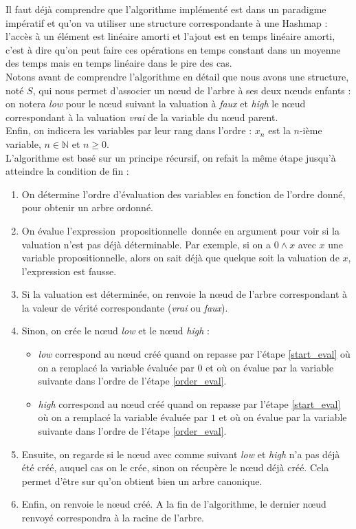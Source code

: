 \documentclass[a4paper, oneside]{report}
\newcommand{\expp}{expression~propositionnelle~}
\begin{document}
Il faut déjà comprendre que l'algorithme implémenté est dans un paradigme impératif et qu'on va utiliser une structure correspondante à une Hashmap : l'accès à un élément est linéaire amorti et l'ajout est en temps linéaire amorti, c'est à dire qu'on peut faire ces opérations en temps constant dans un moyenne des temps mais en temps linéaire dans le pire des cas.\\
Notons avant de comprendre l'algorithme en détail que nous avons une structure, noté $S$, qui nous permet d'associer un nœud de l'arbre à ses deux nœuds enfants : on notera \textit{low} pour le nœud suivant la valuation à \textit{faux} et \textit{high} le nœud correspondant à la valuation \textit{vrai} de la variable du nœud parent.\\
Enfin, on indicera les variables par leur rang dans l'ordre : $x_n$ est la $n$-ième variable, $n\in \mathbb{N}$ et $n\geq 0$.\\

L'algorithme est basé sur un principe récursif, on refait la même étape jusqu'à atteindre la condition de fin :
\begin{enumerate}
\item \label{order_eval} On détermine l'ordre d'évaluation des variables en fonction de l'ordre donné, pour obtenir un arbre ordonné.
\item \label{start_eval} On évalue l'\expp donnée en argument pour voir si la valuation n'est pas déjà déterminable. Par exemple, si on a $0 \wedge x$ avec $x$ une variable propositionnelle, alors on sait déjà que quelque soit la valuation de $x$, l'expression est fausse.
\item Si la valuation est déterminée, on renvoie la nœud de l'arbre correspondant à la valeur de vérité correspondante (\textit{vrai} ou \textit{faux}).
\item Sinon, on crée le nœud \textit{low} et le nœud \textit{high} : 
 \begin{itemize}
\item \textit{low} correspond au nœud créé quand on repasse par l'étape \ref{start_eval} où on a remplacé la variable évaluée par $0$ et où on évalue par la variable suivante dans l'ordre de l'étape \ref{order_eval}.
\item \textit{high} correspond au nœud créé quand on repasse par l'étape \ref{start_eval} où on a remplacé la variable évaluée par $1$ et où on évalue par la variable suivante dans l'ordre de l'étape \ref{order_eval}.
\end{itemize}
\item Ensuite, on regarde si le nœud avec comme suivant \textit{low} et \textit{high} n'a pas déjà été créé, auquel cas on le crée, sinon on récupère le nœud déjà créé. Cela permet d'être sur qu'on obtient bien un arbre canonique.
\item Enfin, on renvoie le nœud créé. A la fin de l'algorithme, le dernier nœud renvoyé correspondra à la racine de l'arbre.
\end{enumerate}
\end{document}
